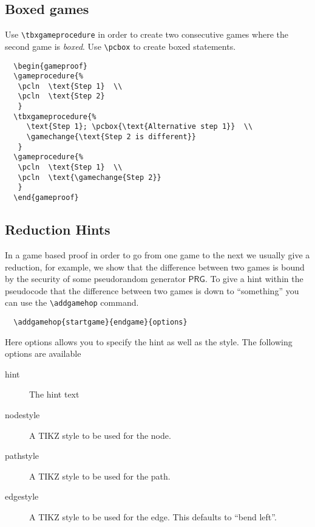 \documentclass[a4paper]{report}
\begin{document}
  \subsection{Boxed games}
  Use \lstinline$\tbxgameprocedure$ in order to create two consecutive games where the second game is \emph{boxed}. Use
  \lstinline$\pcbox$ to create boxed statements.
  \begin{center}
  \begin{gameproof}
  \end{gameproof}
  \end{center}
  
  \begin{lstlisting}
  \begin{gameproof}
  \gameprocedure{%
   \pcln  \text{Step 1}  \\
   \pcln  \text{Step 2}  
   }
  \tbxgameprocedure{%
	 \text{Step 1}; \pcbox{\text{Alternative step 1}}  \\
	 \gamechange{\text{Step 2 is different}}  
   }
  \gameprocedure{%
   \pcln  \text{Step 1}  \\
   \pcln  \text{\gamechange{Step 2}}  
   } 
  \end{gameproof}
  \end{lstlisting}
  
  \subsection{Reduction Hints}
  In a game based proof in order to go from one game to the next we usually give a reduction, for example, we show that
  the difference between two games is bound by the security of some pseudorandom generator $\mathsf{PRG}$. To give a hint
  within the pseudocode that the difference between two games is down to ``something'' you can use the \lstinline$\addgamehop$
  command.
  \begin{lstlisting}
  \addgamehop{startgame}{endgame}{options}
  \end{lstlisting}
  Here options allows you to specify the hint as well as the style. The following options are available
  \begin{description}
  \item[hint]
  The hint text
  \item[nodestyle]
  A TIKZ style to be used for the node.
  \item[pathstyle]
  A TIKZ style to be used for the path.
  \item[edgestyle]
  A TIKZ style to be used for the edge. This defaults to \enquote{bend left}.
  \end{description}
  
\end{document}
